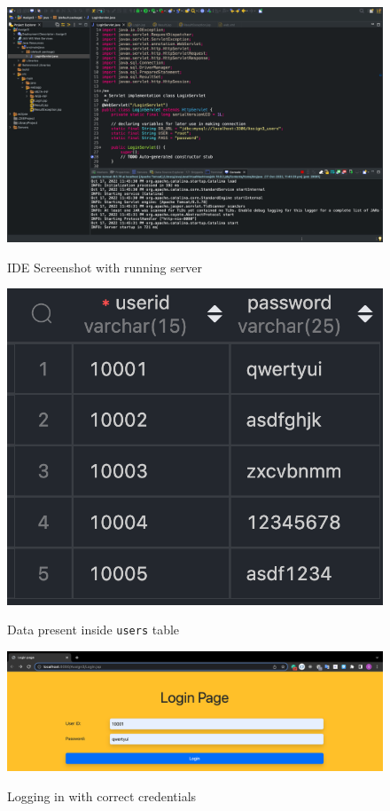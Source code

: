 \documentclass[12pt]{article}
\begin{document}
\vspace{5mm}
\begin{figure}[!hbt]
    \centering
    \includegraphics[scale=0.35]{screenshots/1.png}
    \label{fig:my_label1}
    \caption{IDE Screenshot with running server}
\end{figure}

\newpage

\begin{figure}[!hbt]
    \centering
    \includegraphics[scale=0.6]{screenshots/2.png}
    \label{fig:data}
    \caption{Data present inside \texttt{users} table}
\end{figure}

\begin{figure}[!hbt]
    \centering
    \includegraphics[scale=0.35]{screenshots/3.png}
    \label{fig:my_label1}
    \caption{Logging in with correct credentials}
\end{figure}
\end{document}
